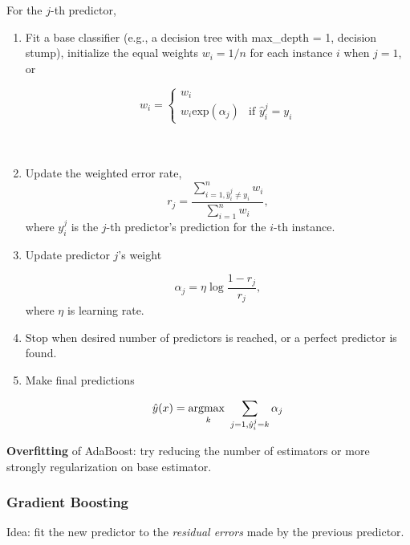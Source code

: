 \documentclass[12pt,oneside,a4paper]{article}
\numberwithin{equation}{section}
\newcommand{\argmax}[1]{\stackunder{\textrm{argmax }}{\scriptsize$#1$}}
\begin{document}
For the $j$-th predictor, 
\begin{enumerate}
\item Fit a base classifier (e.g., a decision tree with max\_depth = 1, decision stump), initialize the equal weights $w_i = 1/n$ for each instance $i$ when $j=1$, or

\begin{equation}
w_i = \left\{ 
\begin{array}{ll}
w_i & \\
w_i \textrm{exp}(\alpha_j) & \textrm{if $\hat{y}_i^j = y_i$}
\end{array}
\right.
\end{equation}
\\~\\

\item Update the weighted error rate,
\begin{equation}
r_j = \frac{\sum_{i=1, \hat{y}_i^j \neq y_i}^{n}w_i}{\sum_{i=1}^{n}w_i},
\end{equation}
where $y_i^j$ is the $j$-th predictor's prediction for the $i$-th instance.


\item Update predictor $j$'s weight

\begin{equation}
\alpha_j = \eta \log \frac{1 - r_j}{r_j},
\end{equation}
where $\eta$ is learning rate. 

\item Stop when desired number of predictors is reached, or a perfect predictor is found. 

\item Make final predictions 

\begin{equation}
\hat{y}(x) = \argmax{k} \sum_{j = 1, \hat{y}_i^j = k} \alpha_j
\end{equation}
\end{enumerate} 

\textbf{Overfitting} of AdaBoost: try reducing the number of estimators or more strongly regularization on base estimator. 


\subsubsection{Gradient Boosting}

Idea: fit the new predictor to the \emph{residual errors} made by the previous predictor. 
\end{document}
